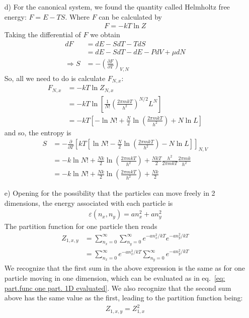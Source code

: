 \documentclass[11pt]{article}
\newcounter{excount}
\newenvironment{exercise}[1][]{\addtocounter{excount}{1} \noindent {\bf Exercise
    \arabic{excount} #1}\hspace{2mm}}{\vspace{4mm}}
\begin{document}
\begin{exercise}
\begin{itemize}
		
		\item[d)]
			For the canonical system, we found the quantity called Helmholtz free energy: $F=E-TS$. Where $F$ can be calculated by
			\begin{align*}
				F = -kT\ln Z
			\end{align*}
			Taking the differential of $F$ we obtain
			\begin{align*}
				dF 	&= dE - SdT - TdS \\
						&= dE - SdT - dE - PdV + \mu dN \\
						\Rightarrow S &= -\left( \frac{\partial F}{\partial T} \right) _{V,N}
			\end{align*}
			So, all we need to do is calculate $F_{N,x}$:
			\begin{align*}
				F_{N,x}	&= -kT\ln Z_{N,x} \\
							&= -kT \ln \left[ \frac{1}{N!}\left( \frac{2\pi mkT}{h^2} \right) ^{N/2} L^N \right] \\
							&= -kT \left[ -\ln N! + \frac{N}{2}\ln \left( \frac{2\pi mkT}{h^2} \right) + N\ln L  \right]
			\end{align*}
			and so, the entropy is
			\begin{align*}
				S 	&= -\frac{\partial}{\partial T} \left[ kT \left[ \ln N! - \frac{N}{2}\ln \left( \frac{2\pi mkT}{h^2} \right) - N\ln L  \right] \right]_{N,V} \\
					&=  -k\ln N! + \frac{Nk}{2}\ln \left( \frac{2\pi mkT}{h^2} \right) + \frac{NkT}{2} \frac{h^2}{2\pi mkT} \frac{2\pi mk}{h^2} \\
					&= -k\ln N! + \frac{Nk}{2}\ln \left( \frac{2\pi mkT}{h^2} \right) + \frac{Nk}{2}
			\end{align*}
		
		
		
		
		\item[e)]
			Opening for the possibility that the particles can move freely in 2 dimensions, the energy associated with each particle is
			\begin{align*}
				\varepsilon(n_x, n_y) = an_x^2 + an_y^2
			\end{align*}
			The partition function for one particle then reads
			\begin{align*}
				Z_{1,x,y} 	&= \sum_{n_x=0}^{\infty} \sum_{n_y=0}^\infty e^{-an_x^2/kT}e^{-an_y^2/kT} \\
								&= \sum_{n_x=0}^{\infty}  e^{-an_x^2/kT} \sum_{n_y=0}^\infty e^{-an_y^2/kT}
			\end{align*}
			We recognize that the first sum in the above expression is the same as for one particle moving in one dimension, which can be evaluated as in eq.~\ref{eq: part.func one part. 1D evaluated}. We also recognize that the second sum above has the same value as the first, leading to the partition function being:
			\begin{align}
				Z_{1,x,y} = Z_{1,x}^2 \label{eq: part.func. 2D one particle}
			\end{align}
			

\end{itemize}
\end{exercise}
\end{document}
